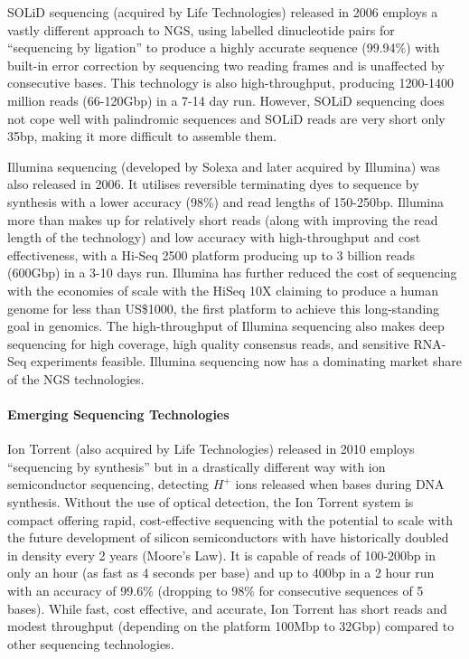 SOLiD sequencing (acquired by Life Technologies) released in 2006 employs a vastly different approach to NGS, using labelled dinucleotide pairs for ``sequencing by ligation'' to produce a highly accurate sequence (99.94\%) with built-in error correction by sequencing two reading frames and is unaffected by consecutive bases. This technology is also high-throughput, producing 1200-1400 million reads (66-120Gbp) in a 7-14 day run. However, SOLiD sequencing does not cope well with palindromic sequences and SOLiD reads are very short only 35bp, making it more difficult to assemble them.

Illumina sequencing (developed by Solexa and later acquired by Illumina) was also released in 2006. It utilises reversible terminating dyes to sequence by synthesis with a lower accuracy (98\%) and read lengths of 150-250bp. Illumina more than makes up for relatively short reads (along with improving the read length of the technology) and low accuracy with high-throughput and cost effectiveness, with a Hi-Seq 2500 platform producing up to 3 billion reads (600Gbp) in a 3-10 days run. Illumina has further reduced the cost of sequencing with the economies of scale with the HiSeq 10X claiming to produce a human genome for less than US\$1000, the first platform to achieve this long-standing goal in genomics. The high-throughput of Illumina sequencing also makes deep sequencing for high coverage, high quality consensus reads, and sensitive RNA-Seq experiments feasible. Illumina sequencing now has a dominating market share of the NGS technologies.

\paragraph{Emerging Sequencing Technologies}

Ion Torrent (also acquired by Life Technologies) released in 2010 employs ``sequencing by synthesis'' but in a drastically different way with ion semiconductor sequencing, detecting $H^+$ ions released when bases during DNA synthesis. Without the use of optical detection, the Ion Torrent system is compact offering rapid, cost-effective sequencing with the potential to scale with the future development of silicon semiconductors with have historically doubled in density every 2 years (Moore's Law). It is capable of reads of 100-200bp in only an hour (as fast as 4 seconds per base) and up to 400bp in a 2 hour run with an accuracy of 99.6\% (dropping to 98\% for consecutive sequences of 5 bases). While fast, cost effective, and accurate, Ion Torrent has short reads and modest throughput (depending on the platform 100Mbp to 32Gbp) compared to other sequencing technologies.

